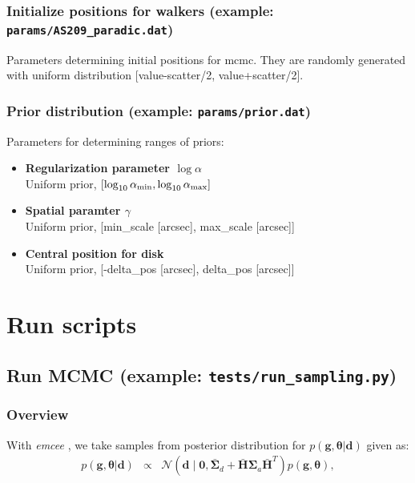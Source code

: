 \documentclass{report}
\begin{document}
\subsection{Initialize positions for walkers (example: \texttt{params/AS209\_paradic.dat})  \label{sec:initial_para}}
Parameters determining initial positions for mcmc. They are randomly generated with uniform distribution [value-scatter/2, value+scatter/2].

\subsection{Prior distribution (example: \texttt{params/prior.dat})  \label{sec:prior_config}}
Parameters for determining ranges of priors: 
\begin{itemize}
    \item {\bf Regularization parameter $\log \alpha$}\\
    Uniform prior, $[\log_{10}\alpha_{\rm min}, \log_{10}\alpha_{\rm max}]$
    \item {\bf Spatial paramter $\gamma$} \\ Uniform prior, [min\_scale [arcsec], max\_scale [arcsec]]
    \item {\bf Central position for disk} \\ 
    Uniform prior,  [-delta\_pos [arcsec], delta\_pos [arcsec]]
\end{itemize}



\chapter{Run scripts \label{sec:run_script}}
\section{Run MCMC (example: \texttt{tests/run\_sampling.py}) \label{sec:mcmc_run}}
\subsection{Overview}

With {\it emcee} \citep{2013PASP..125..306F}, we take samples from posterior distribution for $ p(\bm{g} , \bm{\theta}|\bm{d})$ given as: 
\begin{eqnarray}
   p(\bm{g} , \bm{\theta}|\bm{d}) &\propto&  \mathcal{N}(\bm{d} \mid \bm{0}, \bar{\bm{\Sigma}}_{d} +   \bar{\bm{H}} \bm{\Sigma}_{a} \bar{\bm{H}}^{T}) p(\bm{g} , \bm{\theta}), 
\end{eqnarray}
\end{document}
